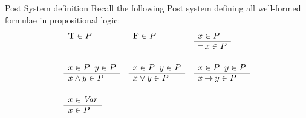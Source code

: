 \begin{wideslide}[bm=,toc=]{Post System definition}
Recall the following Post system defining all well-formed formulae in
propositional logic:
\begin{displaymath}
\begin{array}{lll}
        \begin{array}[t]{l}
        \mbox{\bf T}\in P
        \end{array}
&
        \begin{array}[t]{l}
        \mbox{\bf F}\in P
        \end{array}
&
	\begin{array}[t]{l}
        x \in P \\
        \hline
        \mathop{\neg} x \in P
        \end{array} \\[6ex]

	\begin{array}[t]{l}
	x \in P \;\;y \in P \\
	\hline
	x \land y \in P
	\end{array}
&
	\begin{array}[t]{l}
	x \in P \;\;y \in P \\
	\hline
	x \lor y \in P
	\end{array}
&
	\begin{array}[t]{l}
	x \in P \;\;y \in P \\
	\hline
	x \mathbin{\rightarrow} y \in P
	\end{array} \\[6ex]

	\begin{array}[t]{l}
        x \in \mbox{\it Var\/} \\
        \hline
        x \in P
        \end{array}
\end{array}
\end{displaymath}
\end{wideslide}

